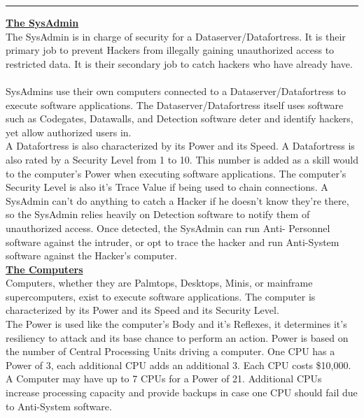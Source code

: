 \documentclass[11pt,twoside,a4paper]{article}
\begin{document}
\begin{multicols*}{2}
\begin{center} \rule{0.45\textwidth}{0.01cm} \end{center}

\textbf{\underline{\large The SysAdmin}}~\\

The SysAdmin is in charge of security for a Dataserver/Datafortress. It is their primary job to prevent Hackers from illegally gaining unauthorized access to restricted data. It is their secondary job to catch hackers who have already have. ~\\

SysAdmins use their own computers connected to a Dataserver/Datafortress to execute software applications. The Dataserver/Datafortress itself uses software such as Codegates, Datawalls, and Detection software deter and identify hackers, yet allow authorized users in. ~\\

A Datafortress is also characterized by its Power and its Speed. A Datafortress is also rated by a Security Level from 1 to 10. This number is added as a skill would to the computer's Power when executing software applications. The computer's Security Level is also it's Trace Value if being used to chain connections. A SysAdmin can't do anything to catch a Hacker if he doesn't know they're there, so the SysAdmin relies heavily on Detection software to notify them of unauthorized access. Once detected, the SysAdmin can run Anti- Personnel software against the intruder, or opt to trace the hacker and run Anti-System software against the Hacker's computer. ~\\

\textbf{\underline{\large The Computers}}~\\

Computers, whether they are Palmtops, Desktops, Minis, or mainframe supercomputers, exist to execute software applications. The computer is characterized by its Power and its Speed and its Security Level. ~\\

The Power is used like the computer's Body and it's Reflexes, it determines it's resiliency to attack and its base chance to perform an action. Power is based on the number of Central Processing Units driving a computer. One CPU has a Power of 3, each additional CPU adds an additional 3. Each CPU costs \$10,000. A Computer may have up to 7 CPUs for a Power of 21. Additional CPUs increase processing capacity and provide backups in case one CPU should fail due to Anti-System software. ~\\


\end{multicols*}
\end{document}
